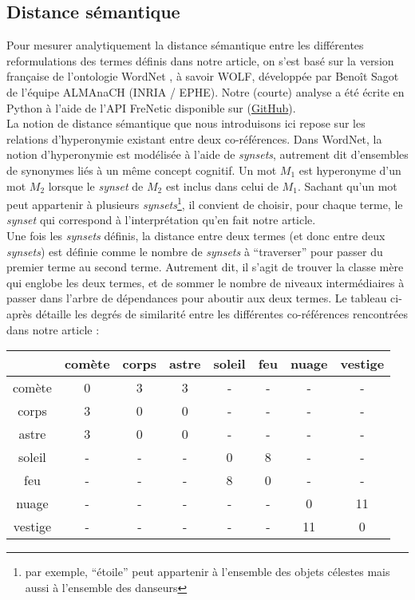 \documentclass[a4paper,10pt]{article}
\begin{document}
	\subsection{Distance sémantique}
		Pour mesurer analytiquement la distance sémantique entre les différentes reformulations des termes définis dans notre article, on s'est basé sur la version française de l'ontologie WordNet \cite{WordNet1998}, à savoir WOLF, développée par Benoît Sagot \cite{Sagot2008} de l'équipe ALMAnaCH (INRIA / EPHE). Notre (courte) analyse a été écrite en Python à l'aide de l'API FreNetic disponible sur (\href{https://github.com/hardik-vala/FreNetic}{GitHub}).\\
		La notion de distance sémantique que nous introduisons ici repose sur les relations d'hyperonymie existant entre deux co-références. Dans WordNet, la notion d'hyperonymie est modélisée à l'aide de  \textit{synsets}, autrement dit d'ensembles de synonymes liés à un même concept cognitif. Un mot $M_1$ est hyperonyme d'un mot $M_2$ lorsque le \textit{synset} de $M_2$ est inclus dans celui de $M_1$. Sachant qu'un mot peut appartenir à plusieurs \textit{synsets}\footnote{par exemple, ``étoile'' peut appartenir à l'ensemble des objets célestes mais aussi à l'ensemble des danseurs}, il convient de choisir, pour chaque terme, le \textit{synset} qui correspond à l'interprétation qu'en fait notre article.\\
		Une fois les \textit{synsets} définis, la distance entre deux termes (et donc entre deux \textit{synsets}) est définie comme le nombre de \textit{synsets} à ``traverser'' pour passer du premier terme au second terme. Autrement dit, il s'agit de trouver la classe mère qui englobe les deux termes, et de sommer le nombre de niveaux intermédiaires à passer dans l'arbre de dépendances pour aboutir aux deux termes. Le tableau ci-après détaille les degrés de similarité entre les différentes co-références rencontrées dans notre article :
		\begin{center}
			\begin{tabular}{| c || c c c c c c c |}
				\hline
				& comète & corps & astre & soleil & feu & nuage & vestige\\
				\hline
				comète & 0 & 3 & 3 & - & - & - & -\\
				corps & 3 & 0 & 0 & - & - & - & -\\
				astre & 3 & 0 & 0 & - & - & - & -\\
				soleil & - & - & - & 0 & 8 & - & -\\
				feu & - & - & - & 8 & 0 & - & -\\
				nuage & - & - & - & - & - & 0 & 11\\
				vestige & - & - & - & - & - & 11 & 0\\
				\hline
			\end{tabular}
		\end{center}
\end{document}
